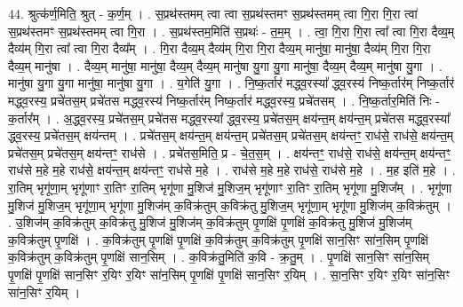 \documentclass[17pt]{extarticle}
\begin{document}
44. श्रुत्क॑र्ण॒मिति॒ श्रुत् - क॒र्ण॒म् । . स॒प्रथ॑स्तमम् त्वा त्वा स॒प्रथ॑स्तमꣳ स॒प्रथ॑स्तमम् त्वा गि॒रा गि॒रा त्वा॑ स॒प्रथ॑स्तमꣳ स॒प्रथ॑स्तमम् त्वा गि॒रा । . स॒प्रथ॑स्तम॒मिति॑ स॒प्रथः॑ - त॒म॒म् । . त्वा॒ गि॒रा गि॒रा त्वा᳚ त्वा गि॒रा दैव्य॒म् दैव्य॑म् गि॒रा त्वा᳚ त्वा गि॒रा दैव्य᳚म् । . गि॒रा दैव्य॒म् दैव्य॑म् गि॒रा गि॒रा दैव्य॒म् मानु॑षा॒ मानु॑षा॒ दैव्य॑म् गि॒रा गि॒रा दैव्य॒म् मानु॑षा । . दैव्य॒म् मानु॑षा॒ मानु॑षा॒ दैव्य॒म् दैव्य॒म् मानु॑षा यु॒गा यु॒गा मानु॑षा॒ दैव्य॒म् दैव्य॒म् मानु॑षा यु॒गा । . मानु॑षा यु॒गा यु॒गा मानु॑षा॒ मानु॑षा यु॒गा । . य॒गेति॑ यु॒गा । . नि॒ष्क॒र्तार॑ मद्ध्व॒रस्या᳚ द्ध्व॒रस्य॑ निष्क॒र्तार॑म् निष्क॒र्तार॑ मद्ध्व॒रस्य॒ प्रचे॑तस॒म् प्रचे॑तस मद्ध्व॒रस्य॑ निष्क॒र्तार॑म् निष्क॒र्तार॑ मद्ध्व॒रस्य॒ प्रचे॑तसम् । . नि॒ष्क॒र्तार॒मिति॑ निः - क॒र्तार᳚म् । . अ॒द्ध्व॒रस्य॒ प्रचे॑तस॒म् प्रचे॑तस मद्ध्व॒रस्या᳚ द्ध्व॒रस्य॒ प्रचे॑तस॒म् क्षय॑न्त॒म् क्षय॑न्त॒म् प्रचे॑तस मद्ध्व॒रस्या᳚ द्ध्व॒रस्य॒ प्रचे॑तस॒म् क्षय॑न्तम् । . प्रचे॑तस॒म् क्षय॑न्त॒म् क्षय॑न्त॒म् प्रचे॑तस॒म् प्रचे॑तस॒म् क्षय॑न्तꣳ॒॒ राध॑से॒ राध॑से॒ क्षय॑न्त॒म् प्रचे॑तस॒म् प्रचे॑तस॒म् क्षय॑न्तꣳ॒॒ राध॑से । . प्रचे॑तस॒मिति॒ प्र - चे॒त॒स॒म् । . क्षय॑न्तꣳ॒॒ राध॑से॒ राध॑से॒ क्षय॑न्त॒म् क्षय॑न्तꣳ॒॒ राध॑से म॒हे म॒हे राध॑से॒ क्षय॑न्त॒म् क्षय॑न्तꣳ॒॒ राध॑से म॒हे । . राध॑से म॒हे म॒हे राध॑से॒ राध॑से म॒हे । . म॒ह इति॑ म॒हे । . रा॒तिम् भृगू॑णा॒म् भृगू॑णाꣳ रा॒तिꣳ रा॒तिम् भृगू॑णा मु॒शिज॑ मु॒शिज॒म् भृगू॑णाꣳ रा॒तिꣳ रा॒तिम् भृगू॑णा मु॒शिज᳚म् । . भृगू॑णा मु॒शिज॑ मु॒शिज॒म् भृगू॑णा॒म् भृगू॑णा मु॒शिज॑म् क॒विक्र॑तुम् क॒विक्र॑तु मु॒शिज॒म् भृगू॑णा॒म् भृगू॑णा मु॒शिज॑म् क॒विक्र॑तुम् । . उ॒शिज॑म् क॒विक्र॑तुम् क॒विक्र॑तु मु॒शिज॑ मु॒शिज॑म् क॒विक्र॑तुम् पृ॒णक्षि॑ पृ॒णक्षि॑ क॒विक्र॑तु मु॒शिज॑ मु॒शिज॑म् क॒विक्र॑तुम् पृ॒णक्षि॑ । . क॒विक्र॑तुम् पृ॒णक्षि॑ पृ॒णक्षि॑ क॒विक्र॑तुम् क॒विक्र॑तुम् पृ॒णक्षि॑ सान॒सिꣳ सा॑न॒सिम् पृ॒णक्षि॑ क॒विक्र॑तुम् क॒विक्र॑तुम् पृ॒णक्षि॑ सान॒सिम् । . क॒विक्र॑तु॒मिति॑ क॒वि - क्र॒तु॒म् । . पृ॒णक्षि॑ सान॒सिꣳ सा॑न॒सिम् पृ॒णक्षि॑ पृ॒णक्षि॑ सान॒सिꣳ र॒यिꣳ र॒यिꣳ सा॑न॒सिम् पृ॒णक्षि॑ पृ॒णक्षि॑ सान॒सिꣳ र॒यिम् । . सा॒न॒सिꣳ र॒यिꣳ र॒यिꣳ सा॑न॒सिꣳ सा॑न॒सिꣳ र॒यिम् । \newline
\pagebreak
{}
\end{document}

